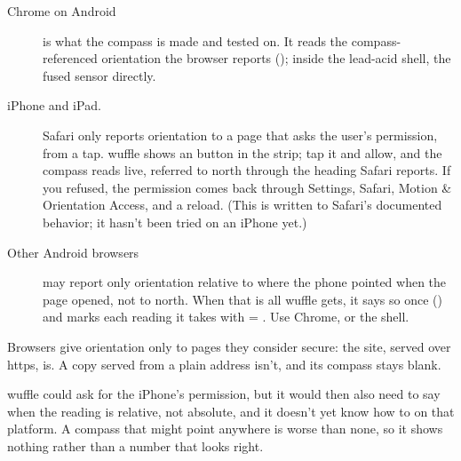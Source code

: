 \begin{description}
\item[Chrome on Android] is what the compass is made and tested on. It reads the
compass-referenced orientation the browser reports (); inside the
lead-acid shell, the fused sensor directly.
\item[iPhone and iPad.] Safari only reports orientation to a page that asks the user's permission, from a
tap. wuffle shows an  button in the strip; tap it and allow, and the compass reads
live, referred to north through the heading Safari reports. If you refused, the permission comes back
through Settings, Safari, Motion \& Orientation Access, and a reload. (This is written to Safari's
documented behavior; it hasn't been tried on an iPhone yet.)
\item[Other Android browsers] may report only orientation relative to where the phone pointed when the
page opened, not to north. When that is all wuffle gets, it says so once () and
marks each reading it takes with  = . Use Chrome, or the shell.
\end{description}

Browsers give orientation only to pages they consider secure: the site, served over https, is. A copy
served from a plain  address isn't, and its compass stays blank.

\begin{why}
wuffle could ask for the iPhone's permission, but it would then also need to say when the reading is
relative, not absolute, and it doesn't yet know how to on that platform. A compass that might point
anywhere is worse than none, so it shows nothing rather than a number that looks right.
\end{why}
